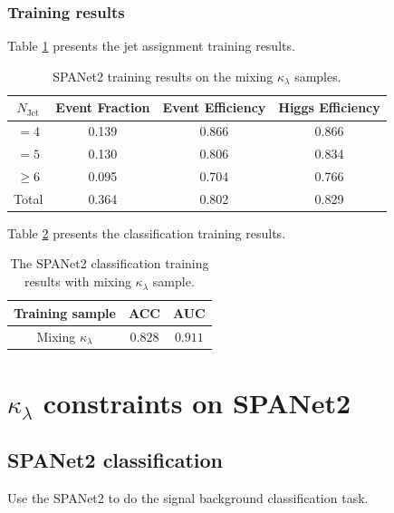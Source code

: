 \documentclass[12pt]{article}
\begin{document}
		\subsubsection{Training results}%
		\label{subs:training_results}
			Table \ref{tab:SPANet2_diHiggs_4b_pt40_mix_class} presents the jet assignment training results.
			\begin{table}[htpb]
				\centering
				\caption{SPANet2 training results on the mixing $\kappa_\lambda$ samples.}
				\label{tab:SPANet2_diHiggs_4b_pt40_mix_class}
				\begin{tabular}{c|c|cc}
					$N_\text{Jet}$ & Event Fraction & Event Efficiency & Higgs Efficiency \\
					\hline
					$=4$	  &   0.139             &    0.866              &    0.866             \\
					$=5$	  &   0.130             &    0.806              &    0.834             \\
					$\ge 6$	  &   0.095             &    0.704              &    0.766             \\
					Total	  &   0.364             &    0.802              &    0.829             \\
				\end{tabular}
			\end{table}	

			Table \ref{tab:SPANET_cls_results} presents the classification training results.
			\begin{table}[htpb]
				\centering
				\caption{The SPANet2 classification training results with mixing $\kappa_\lambda$ sample.}
				\label{tab:SPANET_cls_results}
				\begin{tabular}{c|cc}
				Training sample        & ACC     & AUC   \\ \hline
				Mixing $\kappa_\lambda $ & $0.828$ & $0.911$
				\end{tabular}      
			\end{table}

\section{\texorpdfstring{$\kappa_\lambda$}{kappa} constraints on SPANet2}%
\label{sec:kappa_constraints_on_spanet2}

	\subsection{SPANet2 classification}%
	\label{sub:spanet2_classification}
		Use the SPANet2 to do the signal background classification task. 
\end{document}
